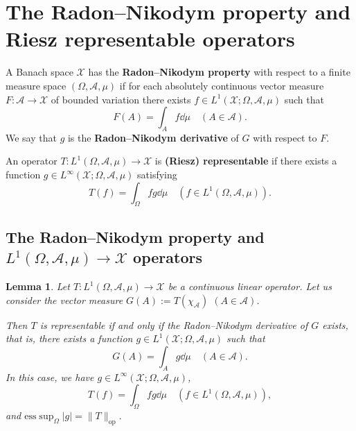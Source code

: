 \documentclass[a4paper, 12pt]{article}
\newtheorem{lem}{Lemma}[section]
\begin{document}
\section{The Radon\---Nikodym property and Riesz representable operators}\label{sec:radon-nikodym-property}

A Banach space $\mathcal{X}$ has the \textbf{Radon\---Nikodym property} with respect to a finite measure space $(\Omega, \mathcal{A}, \mu)$ if for each absolutely continuous vector measure $F\colon \mathcal{A} \to \mathcal{X}$ of bounded variation there exists $f \in L^1(\mathcal{X}; \Omega, \mathcal{A}, \mu)$ such that 
$$F(A) = \int_{A} f \dd{\mu} \quad (A \in \mathcal{A}).$$
We say that $g$ is the \textbf{Radon\---Nikodym derivative} of $G$ with respect to $F$.

An operator $T\colon L^1(\Omega, \mathcal{A}, \mu) \to \mathcal{X}$ is \textbf{(Riesz) representable} if there exists a function $g \in L^{\infty}(\mathcal{X}; \Omega, \mathcal{A}, \mu)$ satisfying
$$T(f) = \int_{\Omega} f g \dd{\mu} \quad (f \in L^1(\Omega, \mathcal{A}, \mu)).$$

\subsection{The Radon\---Nikodym property and $L^1(\Omega, \mathcal{A}, \mu) \to \mathcal{X}$ operators}
\begin{lem}\label{lem:spec-representable-op} Let $T \colon L^1(\Omega, \mathcal{A}, \mu) \to \mathcal{X}$ be a continuous linear operator. Let us consider the vector measure $G(A):=T(\mathcal{\chi_A})$ $(A \in \mathcal{A})$.

Then $T$ is representable if and only if the Radon\---Nikodym derivative of $G$ exists, that is, there exists a function $g \in L^1(\mathcal{X}; \Omega, \mathcal{A}, \mu)$ such that
$$G(A) = \int_{A} g \dd{\mu} \quad (A \in \mathcal{A}).$$
In this case, we have $g \in L^{\infty}(\mathcal{X}; \Omega, \mathcal{A}, \mu)$,
$$T(f) = \int_{\Omega} f g \dd{\mu} \quad (f \in L^1(\Omega, \mathcal{A}, \mu)),$$
and $ \mathrm{ess} \sup_{\Omega} |g| = \| T \|_{\mathrm{op}}.$
\end{lem}
\end{document}
